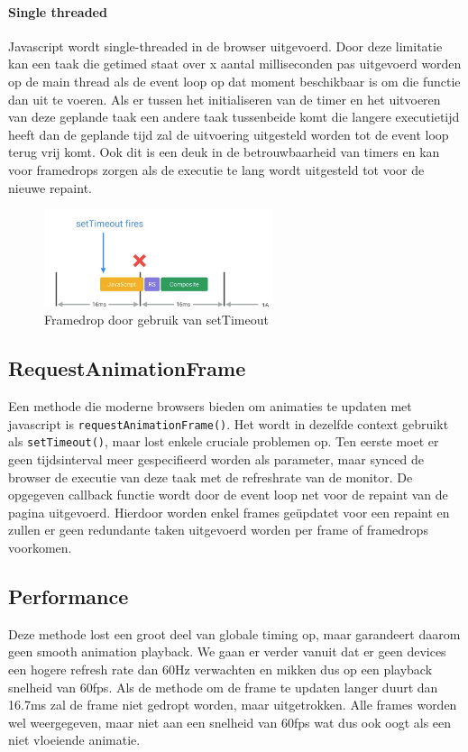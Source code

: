 \paragraph{Single threaded}
Javascript wordt single-threaded in de browser uitgevoerd. Door deze limitatie kan een taak die getimed staat over x aantal milliseconden pas uitgevoerd worden op de main thread als de event loop op dat moment beschikbaar is om die functie dan uit te voeren. Als er tussen het initialiseren van de timer en het uitvoeren van deze geplande taak een andere taak tussenbeide komt die langere executietijd heeft dan de geplande tijd zal de uitvoering uitgesteld worden tot de event loop terug vrij komt. Ook dit is een deuk in de betrouwbaarheid van timers en kan voor framedrops zorgen als de executie te lang wordt uitgesteld tot voor de nieuwe repaint.

\begin{figure} [H]
	\centering
	\includegraphics [width=0.6\textwidth] {img/drift-framedrop.png}
	\caption{Framedrop door gebruik van setTimeout} \label{drift-framedrop}
\end{figure}

\subsection{RequestAnimationFrame}

Een methode die moderne browsers bieden om animaties te updaten met javascript is \texttt{requestAnimationFrame()}. Het wordt in dezelfde context gebruikt als \texttt{setTimeout()}, maar lost enkele cruciale problemen op. Ten eerste moet er geen tijdsinterval meer gespecifieerd worden als parameter, maar synced de browser de executie van deze taak met de refreshrate van de monitor. De opgegeven callback functie wordt door de event loop net voor de repaint van de pagina uitgevoerd. Hierdoor worden enkel frames geüpdatet voor een repaint en zullen er geen redundante taken uitgevoerd worden per frame of framedrops voorkomen. \cite{requestFrameDocs}

\subsection{Performance} \label{performance}
Deze methode lost een groot deel van globale timing op, maar garandeert daarom geen smooth animation playback. We gaan er verder vanuit dat er geen devices een hogere refresh rate dan 60Hz verwachten en mikken dus op een playback snelheid van 60fps. Als de methode om de frame te updaten langer duurt dan 16.7ms zal de frame niet gedropt worden, maar uitgetrokken. Alle frames worden wel weergegeven, maar niet aan een snelheid van 60fps wat dus ook oogt als een niet vloeiende animatie.

